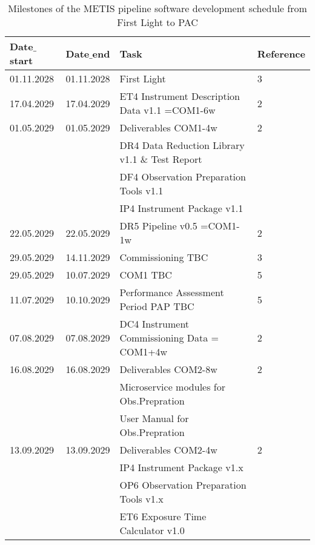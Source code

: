 \begin{table}[h!]
    \caption[Development schedule 2]{Milestones of the METIS pipeline software development schedule from First Light to PAC}
  \label{tab:development_schedule2}

\centering
\scriptsize
\begin{tabularx}{\textwidth}{llll}

\hline
Date$\_$start &	Date$\_$end   &	Task                            &		Reference \\
\hline\hline
01.11.2028 & 01.11.2028 & First Light 						                  &	3 \\
\hline
17.04.2029 & 17.04.2029 & ET4 Instrument Description Data v1.1 =COM1-6w		  &	2 \\
\hline
01.05.2029 & 01.05.2029 & Deliverables COM1-4w                                &	2 \\
    &          & DR4 Data Reduction Library v1.1 \& Test Report               &	\\
    &	  	   & DF4 Observation Preparation Tools v1.1                       &	\\
    &		   & IP4 Instrument Package v1.1				                  &	\\
\hline
22.05.2029 & 22.05.2029 & DR5 Pipeline v0.5 =COM1-1w				        &	2 \\
\hline 
29.05.2029 & 14.11.2029 & Commissioning TBC					                &	3 \\
\hline
29.05.2029 & 10.07.2029 & COM1 TBC						                    &	5 \\
\hline
11.07.2029 & 10.10.2029 & Performance Assessment Period PAP TBC			    &	5 \\
\hline
07.08.2029 & 07.08.2029 & DC4 Instrument Commissioning Data = COM1+4w		&   2 \\
\hline
16.08.2029 & 16.08.2029 & Deliverables COM2-8w                              &	2 \\
    &          & Microservice modules for Obs.Prepration                    &	\\
    &		   & User Manual for Obs.Prepration				                &	\\
\hline
13.09.2029 & 13.09.2029 & Deliverables COM2-4w                              & 	2 \\
    &          & IP4 Instrument Package v1.x                                &	\\
    &	       & OP6 Observation Preparation Tools v1.x                     &	\\
    &		   & ET6 Exposure Time Calculator v1.0                          &	\\

\end{tabularx}
\end{table}
